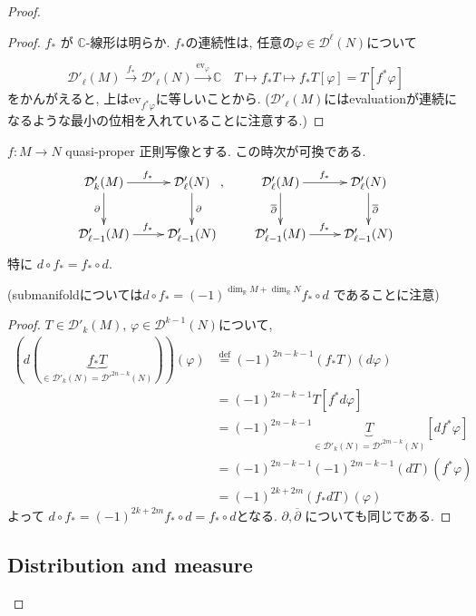 \begin{proof}
\begin{proof}
\( f_* \) が \( \mathbb{C} \)-線形は明らか. 
\( f_* \)の連続性は, 
任意の\(\varphi\in \mathcal{D}^{\ell}(N)\)について

\[
\mathcal{D}'_{\ell}(M)\overset{f_*}{\longrightarrow}\mathcal{D}'_{\ell}(N)\overset{\mathrm{ev}_\varphi}{\longrightarrow}\mathbb{C}
\quad 
T\longmapsto f_*T \longmapsto f_{*}T[\varphi]=T[f^*\varphi]
\]
をかんがえると, 上はev\(_{f^*\varphi}\)に等しいことから. ($\mathcal{D}'_{\ell}(M)$にはevaluationが連続になるような最小の位相を入れていることに注意する.)
\end{proof}


\begin{tcolorbox}[mybox]
\begin{lem}
\label{lem-M-4.2.6}
\( f:M\to N \) quasi-proper 正則写像とする. 
この時次が可換である. 
\[
\xymatrix{
\mathcal{D}'_{k}(M) \ar[r]^{f_*} \ar[d]_{\partial}
& \mathcal{D}'_{\ell}(N) \ar[d]^{\partial}
\\
\mathcal{D}'_{\ell-1}(M) \ar[r]^{f_*}
& \mathcal{D}'_{\ell-1}(N)
}
,\qquad
\xymatrix{
\mathcal{D}'_{\ell}(M) \ar[r]^{f_*} \ar[d]_{\overline{\partial}}
& \mathcal{D}'_{\ell}(N) \ar[d]^{\overline{\partial}}
\\
\mathcal{D}'_{\ell-1}(M) \ar[r]^{f_*}
& \mathcal{D}'_{\ell-1}(N)
}
\]
特に \( d\circ f_* = f_*\circ d \).
\end{lem}
\end{tcolorbox}
 (submanifoldについては\( d\circ f_* = (-1)^{\dim_{\mathbb{R}}M+\dim_{\mathbb{R}}N} f_*\circ d \) であることに注意)

\begin{proof}
\( T\in \mathcal{D}'_{k}(M) \), \( \varphi\in \mathcal{D}^{k-1}(N) \)について, 
\begin{align*}
(d(\underbrace{f_*T}_{\in  \mathcal{D}'_{k}(N)= \mathcal{D}'^{2n-k}(N)  }))(\varphi)
&\overset{\text{def}}{=}
(-1)^{2n-k-1}(f_*T)(d\varphi)
\\
&=
(-1)^{2n-k-1}T[f^*d\varphi]
\\
&=
(-1)^{2n-k-1}\underbrace{T}_{ \in \mathcal{D}'_{k}(N)= \mathcal{D}'^{2m-k}(N)  }[df^*\varphi]
\\
&=
(-1)^{2n-k-1}(-1)^{2m-k-1}(dT)(f^*\varphi)
\\
&=
(-1)^{2k+2m}(f_*dT)(\varphi)
\end{align*}
よって
$d\circ f_* = (-1)^{2k+2m} f_*\circ d = f_*\circ d$となる. 
\( \partial,\overline{\partial} \) についても同じである. 
\end{proof}

\subsection{Distribution and measure}


\end{proof}
